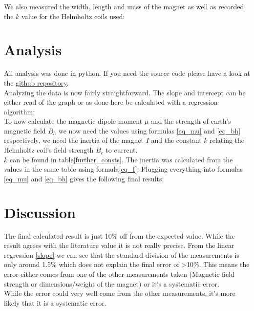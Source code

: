 \documentclass[14pt]{article}
\begin{document}
We also measured the width, length and mass of the magnet as well as recorded the $k$ value for the Helmholtz
coils used:\\




\section{Analysis}

All analysis was done in python. If you need the source code please have a look at the 
\href{https://github.com/sidney-pauly/papers}{github repository}.\\

Analyzing the data is now fairly straightforward. The slope and intercept can be either
read of the graph or as done here be calculated with a regression algorithm:\\



To now calculate the magnetic dipole moment $\mu$ and the strength of earth's magnetic
field $B_h$ we now need the values using formulas \ref{eq_mu} and \ref{eq_bh} respectively, we need
the inertia of the magnet $I$ and the constant $k$ relating the Helmholtz coil's field strength $B_c$ to current.\\
$k$ can be found in table\ref{further_consts}. The inertia was calculated from the values in the same table
using formula\ref{eq_I}. Plugging everything into formulas \ref{eq_mu} and \ref{eq_bh} gives the following
final results:\\



\section{Discussion}

The final calculated result is just 10\% off from the expected value. While the result agrees with the literature
value it is not really precise. From the linear regression \ref{slope} we can see that the standard division
of the measurements is only around 1.5\% which does not explain the final error of >10\%. This means the error
either comes from one of the other measurements taken (Magnetic field strength or dimensions/weight of the magnet)
or it's a systematic error.\\

While the error could very well come from the other measurements, it's more likely that it is a systematic error.\\
\end{document}
